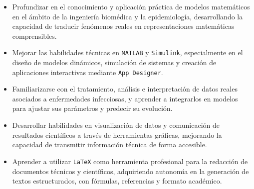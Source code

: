 \begin{itemize}
  \item Profundizar en el conocimiento y aplicación práctica de modelos matemáticos en el ámbito de la ingeniería biomédica y la epidemiología, desarrollando la capacidad de traducir fenómenos reales en representaciones matemáticas comprensibles.
  \item Mejorar las habilidades técnicas en \texttt{MATLAB} y \texttt{Simulink}, especialmente en el diseño de modelos dinámicos, simulación de sistemas y creación de aplicaciones interactivas mediante \texttt{App Designer}.
  \item Familiarizarse con el tratamiento, análisis e interpretación de datos reales asociados a enfermedades infecciosas, y aprender a integrarlos en modelos para ajustar sus parámetros y predecir su evolución.
  \item Desarrollar habilidades en visualización de datos y comunicación de resultados científicos a través de herramientas gráficas, mejorando la capacidad de transmitir información técnica de forma accesible.
  \item Aprender a utilizar \texttt{LaTeX} como herramienta profesional para la redacción de documentos técnicos y científicos, adquiriendo autonomía en la generación de textos estructurados, con fórmulas, referencias y formato académico.
\end{itemize}

